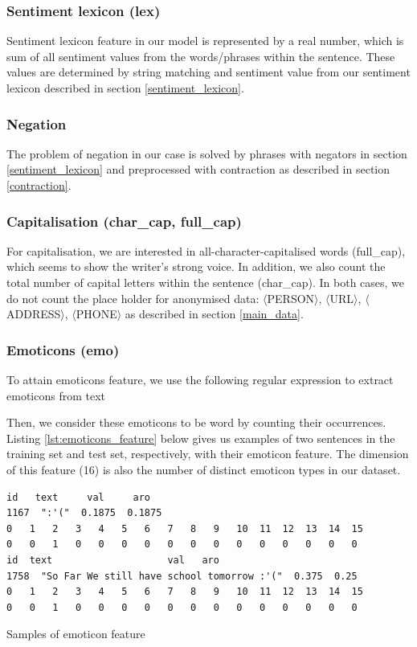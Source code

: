 \documentclass[12pt]{article}
\begin{document}
\subsubsection{Sentiment lexicon (lex)}
Sentiment lexicon feature in our model is represented by a real number, which is sum of all sentiment values from the words/phrases within the sentence. These values are determined by string matching and sentiment value from our sentiment lexicon described in section \ref{sentiment_lexicon}.

\subsubsection{Negation}
The problem of negation in our case is solved by phrases with negators in section \ref{sentiment_lexicon} and preprocessed with contraction as described in section \ref{contraction}.

\subsubsection{Capitalisation (char\_cap, full\_cap)}
For capitalisation, we are interested in all-character-capitalised words (full\_cap), which seems to show the writer's strong voice. In addition, we also count the total number of capital letters within the sentence (char\_cap). In both cases, we do not count the place holder for anonymised data: $\langle$PERSON$\rangle$, $\langle$URL$\rangle$, $\langle$ADDRESS$\rangle$, $\langle$PHONE$\rangle$ as described in section \ref{main_data}.

\subsubsection{Emoticons (emo)}
To attain emoticons feature, we use the following regular expression to extract emoticons from text

Then, we consider these emoticons to be word by counting their occurrences. Listing \ref{lst:emoticons_feature} below gives us examples of two sentences in the training set and test set, respectively, with their emoticon feature. The dimension of this feature (16) is also the number of distinct emoticon types in our dataset.

\begin{listing}[H]
	\begin{verbatim}
id   text     val     aro
1167  ":'("  0.1875  0.1875
0   1   2   3   4   5   6   7   8   9   10  11  12  13  14  15
0   0   1   0   0   0   0   0   0   0   0   0   0   0   0   0
id	text    				val   aro
1758  "So Far We still have school tomorrow :'("  0.375  0.25
0   1   2   3   4   5   6   7   8   9   10  11  12  13  14  15
0   0   1   0   0   0   0   0   0   0   0   0   0   0   0   0
	\end{verbatim}
	\caption{Samples of emoticon feature}
	\label{lst:emoticons_feature}
\end{listing}
\end{document}
